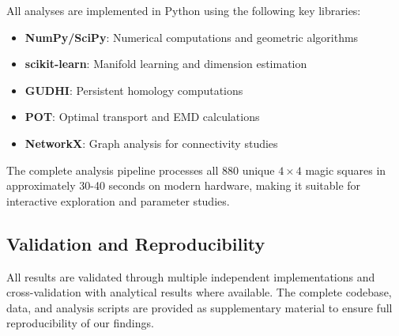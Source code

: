 All analyses are implemented in Python using the following key libraries:
\begin{itemize}
    \item \textbf{NumPy/SciPy}: Numerical computations and geometric algorithms
    \item \textbf{scikit-learn}: Manifold learning and dimension estimation
    \item \textbf{GUDHI}: Persistent homology computations
    \item \textbf{POT}: Optimal transport and EMD calculations
    \item \textbf{NetworkX}: Graph analysis for connectivity studies
\end{itemize}

The complete analysis pipeline processes all 880 unique $4 \times 4$ magic squares in approximately 30-40 seconds on modern hardware, making it suitable for interactive exploration and parameter studies.

\subsection{Validation and Reproducibility}

All results are validated through multiple independent implementations and cross-validation with analytical results where available. The complete codebase, data, and analysis scripts are provided as supplementary material to ensure full reproducibility of our findings. 